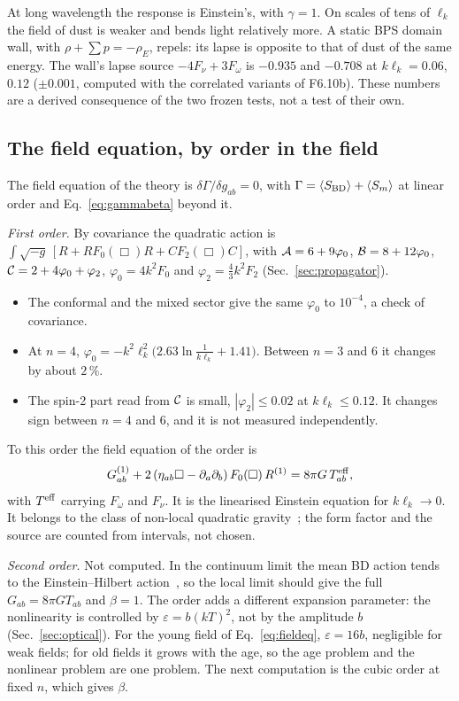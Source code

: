 At long wavelength the response is Einstein's, with $\gamma=1$. On scales of tens of $\ell_k$ the field of dust is
weaker and bends light relatively more. A static BPS domain wall, with $\rho+\sum p=-\rho_E$, repels: its lapse is
opposite to that of dust of the same energy. The wall's lapse source $-4F_\nu+3F_\omega$ is $-0.935$ and $-0.708$ at
$k\ell_k=0.06$, $0.12$ ($\pm0.001$, computed with the correlated variants of F6.10b). These numbers are a derived
consequence of the two frozen tests, not a test of their own.

\subsection{The field equation, by order in the field}

The field equation of the theory is $\delta\Gamma/\delta g_{ab}=0$, with $\Gamma=\langle S_{\mathrm{BD}}\rangle+\langle
S_m\rangle$ at linear order and Eq.~\eqref{eq:gammabeta} beyond it.

\emph{First order.} By covariance the quadratic action is $\int\sqrt{-g}\,[R+RF_0(\Box)R+C F_2(\Box)C]$, with
$\mathcal{A}=6+9\varphi_0$, $\mathcal{B}=8+12\varphi_0$, $\mathcal{C}=2+4\varphi_0+\varphi_2$, $\varphi_0=4k^2F_0$ and
$\varphi_2=\tfrac43k^2F_2$ (Sec.~\ref{sec:propagator}).
\begin{itemize}
\item The conformal and the mixed sector give the same $\varphi_0$ to $10^{-4}$, a check of covariance.
\item At $n=4$, $\varphi_0=-k^2\ell_k^2\bigl(2.63\ln\tfrac{1}{k\ell_k}+1.41\bigr)$. Between $n=3$ and $6$ it changes
  by about $2\,\%$.
\item The spin-2 part read from $\mathcal{C}$ is small, $|\varphi_2|\le0.02$ at $k\ell_k\le0.12$. It changes sign between
  $n=4$ and $6$, and it is not measured independently.
\end{itemize}
To this order the field equation of the order is
\begin{equation}\label{eq:fieldeq}
  G_{ab}^{(1)}+2\,(\eta_{ab}\Box-\partial_a\partial_b)\,F_0(\Box)\,R^{(1)}=8\pi G\,T_{ab}^{\rm eff},
\end{equation}
with $T^{\rm eff}$ carrying $F_\omega$ and $F_\nu$. It is the linearised Einstein equation for $k\ell_k\to0$. It
belongs to the class of non-local quadratic gravity~\cite{Stelle1978}; the form factor and the source are counted
from intervals, not chosen.

\emph{Second order.} Not computed. In the continuum limit the mean BD action tends to the Einstein--Hilbert
action~\cite{BenincasaDowker2010}, so the local limit should give the full $G_{ab}=8\pi GT_{ab}$ and $\beta=1$. The
order adds a different expansion parameter: the nonlinearity is controlled by $\varepsilon=b(kT)^2$, not by the
amplitude $b$ (Sec.~\ref{sec:optical}). For the young field of Eq.~\eqref{eq:fieldeq}, $\varepsilon=16b$,
negligible for weak fields; for old fields it grows with the age, so the age problem and the nonlinear problem are
one problem. The next computation is the cubic order at fixed $n$, which gives $\beta$.

